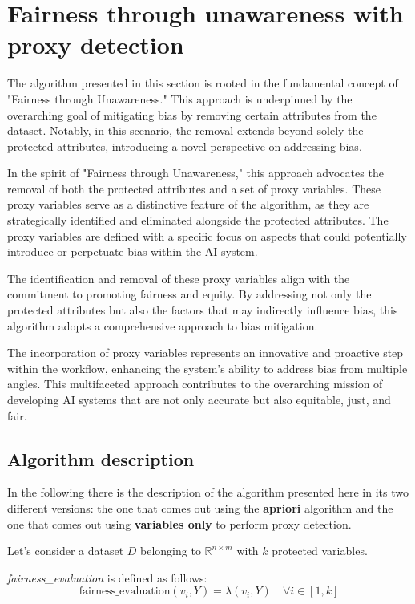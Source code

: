 \documentclass[12pt,a4paper,openright,twoside]{book}
\begin{document}
\section{Fairness through unawareness with proxy detection}
The algorithm presented in this section is rooted in the fundamental concept of "Fairness through Unawareness." This approach is underpinned by the overarching goal of mitigating bias by removing certain attributes from the dataset. Notably, in this scenario, the removal extends beyond solely the protected attributes, introducing a novel perspective on addressing bias. 

In the spirit of "Fairness through Unawareness," this approach advocates the removal of both the protected attributes and a set of proxy variables. These proxy variables serve as a distinctive feature of the algorithm, as they are strategically identified and eliminated alongside the protected attributes. The proxy variables are defined with a specific focus on aspects that could potentially introduce or perpetuate bias within the AI system. \cite{Gupta2018ProxyF}

The identification and removal of these proxy variables align with the commitment to promoting fairness and equity. By addressing not only the protected attributes but also the factors that may indirectly influence bias, this algorithm adopts a comprehensive approach to bias mitigation. 

The incorporation of proxy variables represents an innovative and proactive step within the workflow, enhancing the system's ability to address bias from multiple angles. This multifaceted approach contributes to the overarching mission of developing AI systems that are not only accurate but also equitable, just, and fair.

\subsection{Algorithm description}
In the following there is the description of the algorithm presented here in its two different versions: the one that comes out using the \textbf{apriori} algorithm and the one that comes out using \textbf{variables only} to perform proxy detection. 


Let's consider a dataset \( D \) belonging to \( \mathbb{R}^{n \times m} \) with \( k \) protected variables. 


\textit{fairness\_evaluation} is defined as follows:
\[
\text{fairness\_evaluation}(v_i, Y) = \lambda(v_i, Y) \quad \forall i \in [1, k]
\]
\end{document}
